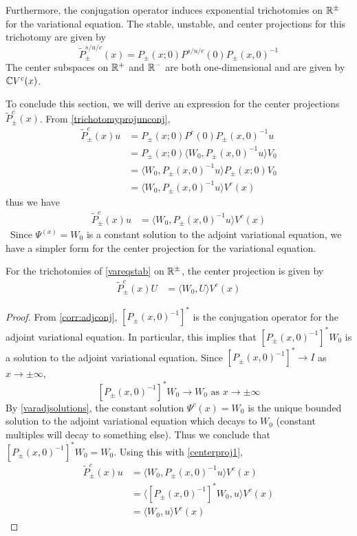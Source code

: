 \documentclass[thesis.tex]{subfiles}
\begin{document}
Furthermore, the conjugation operator induces exponential trichotomies on $\mathbb{R}^\pm$ for the variational equation. The stable, unstable, and center projections for this trichotomy are given by
\begin{equation}\label{trichotomyprojunconj}
\tilde{P}^{s/u/c}_\pm(x) = P_\pm(x; 0) P^{s/u/c}(0) P_\pm(x, 0)^{-1}
\end{equation}
The center subspaces on $\mathbb{R}^+$ and $\mathbb{R}^-$ are both one-dimensional and are given by $\mathbb{C} V^c(x)$. 

To conclude this section, we will derive an expression for the center projections $\tilde{P}^c_\pm(x)$. From \cref{trichotomyprojunconj},
\begin{align*}
\tilde{P}^c_\pm(x) u &= P_\pm(x; 0) P^c(0) P_\pm(x, 0)^{-1} u \\
&= P_\pm(x; 0) \langle W_0, P_\pm(x, 0)^{-1} u \rangle V_0 \\
&= \langle W_0, P_\pm(x, 0)^{-1} u \rangle P_\pm(x; 0) V_0\\
&= \langle W_0, P_\pm(x, 0)^{-1} u \rangle V^c(x)
\end{align*}
thus we have
\begin{align}\label{centerproj1}
\tilde{P}^c_\pm(x) u 
&= \langle W_0, P_\pm(x, 0)^{-1} u \rangle V^c(x)
\end{align}\
Since $\Psi^(x) = W_0$ is a constant solution to the adjoint variational equation, we have a simpler form for the center projection for the variational equation. 

\begin{lemma}\label{centerprojlemma}
For the trichotomies of \cref{vareqstab} on $\mathbb{R}^\pm$, the center projection is given by 
\begin{align}\label{centerproj}
\tilde{P}^c_\pm(x) U &= \langle W_0, U \rangle V^c(x)
\end{align}
\begin{proof}
From \cref{corr:adjconj}, $[P_\pm(x, 0)^{-1}]^*$ is the conjugation operator for the adjoint variational equation. In particular, this implies that $[P_\pm(x, 0)^{-1}]^* W_0$ is a solution to the adjoint variational equation. Since $[P_\pm(x, 0)^{-1}]^* \rightarrow I$ as $x \rightarrow \pm \infty$, 
\[
[P_\pm(x, 0)^{-1}]^* W_0 \rightarrow W_0 \text{ as }x \rightarrow \pm \infty
\]
By \cref{varadjsolutions}, the constant solution $\Psi^c(x) = W_0$ is the unique bounded solution to the adjoint variational equation which decays to $W_0$ (constant multiples will decay to something else). Thus we conclude that $[P_\pm(x, 0)^{-1}]^* W_0 = W_0$. Using this with \cref{centerproj1},
\begin{align*}
\tilde{P}^c_\pm(x) u 
&= \langle W_0, P_\pm(x, 0)^{-1} u \rangle V^c(x) \\
&= \langle [P_\pm(x, 0)^{-1}]^*W_0, u \rangle V^c(x) \\
&= \langle W_0, u \rangle V^c(x) 
\end{align*}
\end{proof}
\end{lemma}
\end{document}
